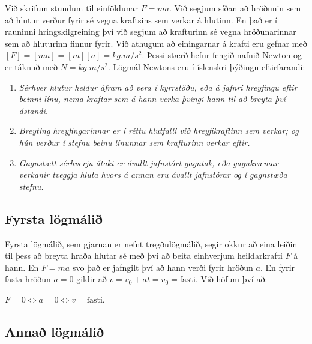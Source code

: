 Við skrifum stundum til einföldunar $F = ma$. Við segjum síðan að hröðunin sem að hlutur verður fyrir sé vegna kraftsins sem verkar á hlutinn. En það er í rauninni hringskilgreining því við segjum að krafturinn sé vegna hröðunarinnar sem að hluturinn finnur fyrir. Við athugum að einingarnar á krafti eru gefnar með $[F] = [ma] = [m][a] = \si{kg.m/s^2}$.
Þessi stærð hefur fengið nafnið Newton og er táknuð með $\si{N} = \si{kg.m/s^2}$. Lögmál Newtons eru í íslenskri þýðingu eftirfarandi:

\begin{tcolorbox}[left=1.8cm]
\begin{enumerate}[label = \textbf{Lögmál \arabic*} \hspace{0.25cm}]
    \item \textit{Sérhver hlutur heldur áfram að vera í kyrrstöðu, eða á jafnri hreyfingu eftir beinni línu, nema kraftar sem á hann verka þvingi hann til að breyta því ástandi.}
    
    \item \textit{Breyting hreyfingarinnar er í réttu hlutfalli við hreyfikraftinn sem verkar; og hún verður í stefnu beinu línunnar sem krafturinn verkar eftir.} 
    
    \item \textit{Gagnstætt sérhverju átaki er ávallt jafnstórt gagntak, eða gagnkvæmar verkanir tveggja hluta hvors á annan eru ávallt jafnstórar og í gagnstæða stefnu.}
\end{enumerate}
\end{tcolorbox}
\subsection*{Fyrsta lögmálið}

Fyrsta lögmálið, sem gjarnan er nefnt tregðulögmálið, segir okkur að eina leiðin til þess að breyta hraða hlutar sé með því að beita einhverjum heildarkrafti $F$ á hann. En $F = ma$ svo það er jafngilt því að hann verði fyrir hröðun $a$. En fyrir fasta hröðun $a = 0$ gildir að $v = v_0 + at = v_0 = \text{fasti}$. Við höfum því að:
\begin{center}
\begin{tcbox}[nobeforeafter]{$F = 0 \iff a = 0 \iff v = \text{fasti}.$}
\end{tcbox}
\end{center}


\subsection*{Annað lögmálið}

